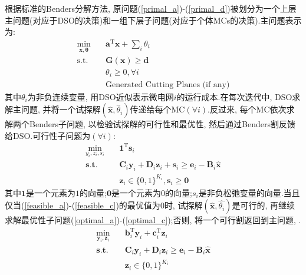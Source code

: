 \documentclass{article}
\begin{document}
根据标准的Benders分解方法, 原问题(\ref{primal_a})-(\ref{primal_d})被划分为一个上层主问题(对应于DSO的决策)和一组下层子问题(对应于个体MCs的决策).主问题表示为:
\begin{subequations}
    \begin{align}
        \min\limits_{\mathbf{x}, \mathbf{\theta}}\quad&\mathbf{a}^\mathrm{T}\mathbf{x}+\sum_i\theta_i \label{master_a}\\
        \mathrm{s.t.}\quad&\mathbf{G}(\mathbf{x})\geq\mathbf{d} \label{master_b}  \\
        &\theta_i\geq0, \forall i \label{master_c}   \\
        &\text{Generated Cutting Planes (if any)} \label{master_d}
    \end{align}
\end{subequations}
其中$\theta_i$为非负连续变量, 用DSO近似表示微电网$i$的运行成本.在每次迭代中, DSO求解主问题, 并将一个试探解$(\hat{\mathbf{x}}, \hat{\theta}_i)$传递给每个MC$(\forall i)$.反过来, 每个MC依次求解两个Benders子问题, 以检验试探解的可行性和最优性, 然后通过Benders割反馈给DSO.可行性子问题为$(\forall i)$:
\begin{subequations}
    \begin{align}
        \min_{y_{i}, z_{i}, s_{i}}\quad& \mathbf{1}^{\mathrm{T}}\mathbf{s}_{i} \label{feasible_a} \\
        \mathbf{s.t.}\quad& \mathbf{C}_i\mathbf{y}_i+\mathbf{D}_i\mathbf{z}_i+\mathbf{s}_i\geq\mathbf{e}_i-\mathbf{B}_i\hat{\mathbf{x}} \label{feasible_b} \\
        &\mathbf{z}_{i}\in\{0, 1\}^{K_{i}}, \mathbf{s}_{i}\geq\mathbf{0} \label{feasible_c}
    \end{align}
\end{subequations}
其中$\mathbf{1}$是一个元素为$1$的向量;$\mathbf{0}$是一个元素为$0$的向量;$s_i$是非负松弛变量的向量.当且仅当(\ref{feasible_a})-(\ref{feasible_c})的最优值为$0$时, 试探解$(\hat{\mathbf{x}}, \hat{\theta_i})$是可行的, 再继续求解最优性子问题(\ref{optimal_a})-(\ref{optimal_c});否则, 将一个可行割返回到主问题, .
\begin{subequations}
    \begin{align}
        \min_{\mathbf{y}_{i}, \mathbf{z}_{i}}\quad& \mathbf{b}_{i}^{\mathrm{T}}\mathbf{y}_{i}+\mathbf{c}_{i}^{\mathrm{T}}\mathbf{z}_{i} \label{optimal_a} \\
        \mathbf{s.t.} \quad&\mathbf{C}_i\mathbf{y}_i+\mathbf{D}_i\mathbf{z}_i\geq\mathbf{e}_i-\mathbf{B}_i\hat{\mathbf{x}} \label{optimal_b} \\
        &\mathbf{z}_{i}\in\{0, 1\}^{K_{i}} \label{optimal_c}
    \end{align}
\end{subequations}
\end{document}
